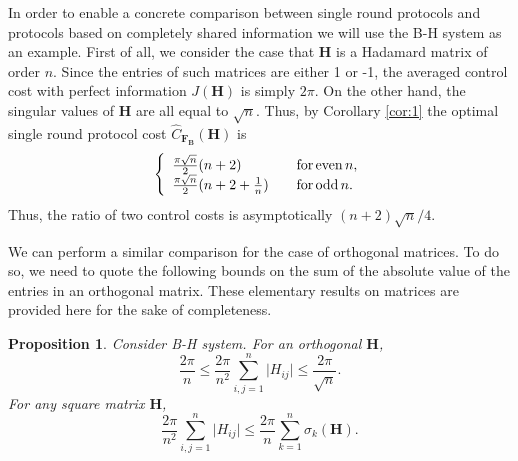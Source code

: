 \documentclass[12pt,onecolumn,draftcls]{IEEEtran}
\newcommand{\bB}{\mathbf{B}}
\newcommand{\bF}{\mathbf{F}}
\newtheorem{proposition}{Proposition}[section]
\begin{document}
In order to enable a concrete comparison between single round protocols and protocols based on completely shared information we will use the B-H system as an example.  First of all, we consider the case that $\mathbf{H}$ is a Hadamard matrix of
order $n$.  Since the entries of such matrices are either 1 or -1, the averaged control cost with perfect information
$J(\mathbf{H})$ is simply $2\pi$.  On the other hand, the singular values of $\mathbf{H}$ are all equal to $\sqrt{n}$.
Thus, by Corollary \ref{cor:1} the optimal single round protocol cost $\hat{C}_{\bF_\bB}(\mathbf{H})$ is
\begin{equation}
\left\{
\begin{array}{lll}
\frac{\pi\sqrt{n}}{2} (n+2) & & {\rm for \,  even \,} n,\\
\frac{\pi\sqrt{n}}{2}(n+2+\frac{1}{n}) &  & {\rm for \, odd \,} n.
\end{array}
\right.
\end{equation}
Thus, the ratio of two control costs is asymptotically $(n+2)\sqrt{n}/4$.

We can perform a similar comparison for the case of orthogonal matrices.   To do so, we need to quote the following bounds on the sum of the absolute
value of the entries in an orthogonal matrix.   These elementary results on matrices are provided here for the sake of completeness.

\begin{proposition}
Consider B-H system.  For an orthogonal $\mathbf{H}$,
\begin{equation}
\frac{2\pi}{n} \leq \frac{2\pi}{n^2} \sum_{i,j=1}^n \vert H_{ij} \vert \leq \frac{2\pi}{\sqrt{n}}.
\end{equation}
For any square matrix $\mathbf{H}$,
\begin{equation}
\frac{2\pi}{n^2} \sum_{i,j=1}^n \vert H_{ij} \vert \leq \frac{2\pi}{n} \sum_{k=1}^n \sigma_k(\mathbf{H}).
\end{equation}
\end{proposition}
\end{document}
